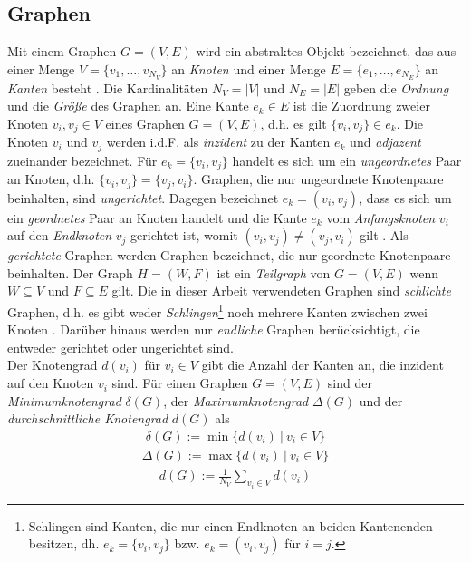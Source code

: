 \documentclass[12pt, a4paper]{report}
\begin{document}
\subsection{Graphen}
Mit einem Graphen $G=(V,E)$ wird ein abstraktes Objekt bezeichnet, das aus einer Menge $V=\{v_1,\dots,v_{N_V}\}$ an \textit{Knoten} und einer Menge $E=\{e_1,\dots,e_{N_E}\}$ an \textit{Kanten} besteht \cite{brandes2005graphfunda}. Die Kardinalitäten $N_V =|V|$ und $N_E=|E|$ geben die \textit{Ordnung} und die \textit{Größe} des Graphen an. Eine Kante $e_k \in E$ ist die Zuordnung zweier Knoten $v_i,v_j \in V$ eines Graphen $G=(V,E)$, d.h. es gilt $\{v_i,v_j\} \in e_k$. Die Knoten $v_i$ und $v_j$ werden \mbox{i.d.F.} als \textit{inzident} zu der Kanten $e_k$ und \textit{adjazent} zueinander bezeichnet. Für $e_k=\{v_i,v_j\}$ handelt es sich um ein \textit{ungeordnetes} Paar an Knoten, d.h. $\{v_i,v_j\}=\{v_j,v_i\}$. Graphen, die nur ungeordnete Knotenpaare beinhalten, sind \textit{ungerichtet}. Dagegen bezeichnet $e_k=(v_i,v_j)$, dass es sich um ein \textit{geordnetes} Paar an Knoten handelt und die Kante $e_k$ vom \textit{Anfangsknoten} $v_i$ auf den \textit{Endknoten} $v_j$ gerichtet ist, womit $(v_i,v_j) \neq (v_j, v_i)$ gilt \cite{kolaczyk2009statistical}. Als \textit{gerichtete} Graphen werden Graphen bezeichnet, die nur geordnete Knotenpaare beinhalten. Der Graph $H=(W,F)$ ist ein \textit{Teilgraph} von $G=(V,E)$ wenn $W \subseteq V$ und $F \subseteq E$ gilt. Die in dieser Arbeit verwendeten Graphen sind \textit{schlichte} Graphen, d.h. es gibt weder \textit{Schlingen}\footnote{ Schlingen sind Kanten, die nur einen Endknoten an beiden Kantenenden besitzen, dh. $e_k=\{v_i,v_j\}$ bzw. $e_k=(v_i,v_j)$ für $i=j$.} noch mehrere Kanten zwischen zwei Knoten \cite{tittmann2011graphen}. Darüber hinaus werden nur \textit{endliche} Graphen berücksichtigt, die entweder gerichtet oder ungerichtet sind.\\
Der Knotengrad $d(v_i)$ für $v_i \in V$ gibt die Anzahl der Kanten an, die inzident auf den Knoten $v_i$ sind. Für einen Graphen $G=(V,E)$ sind der \textit{Minimumknotengrad} $\delta(G)$, der \textit{Maximumknotengrad} $\Delta(G)$ und der \textit{durchschnittliche Knotengrad} $d(G)$ als
\begin{align}
\delta(G):=\min\{d(v_i) \ | \ v_i \in V\}
\end{align}
\begin{align}
\Delta(G):=\max\{d(v_i) \ | \ v_i \in V\}
\end{align}
\begin{align}
d(G):=\frac{1}{N_V}\sum_{v_i \in V}d(v_i)
\end{align}
\end{document}
